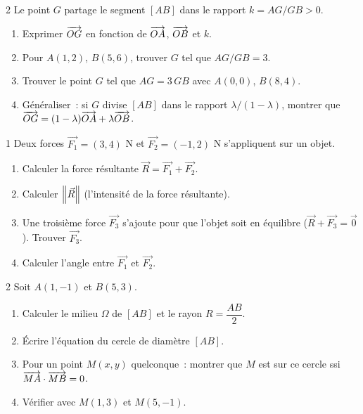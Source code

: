 \begin{probleme}{2}
Le point $G$ partage le segment $[AB]$ dans le rapport $k = AG/GB > 0$.
\begin{enumerate}
  \item Exprimer $\overrightarrow{OG}$ en fonction de $\overrightarrow{OA}$, $\overrightarrow{OB}$ et $k$.
  \item Pour $A(1,2)$, $B(5,6)$, trouver $G$ tel que $AG/GB = 3$.
  \item Trouver le point $G$ tel que $AG = 3\,GB$ avec $A(0,0)$, $B(8,4)$.
  \item G\'en\'eraliser~: si $G$ divise $[AB]$ dans le rapport $\lambda/(1-\lambda)$,
        montrer que $\overrightarrow{OG} = (1-\lambda)\overrightarrow{OA}+\lambda\overrightarrow{OB}$.
\end{enumerate}
\end{probleme}

\begin{probleme}{1}
Deux forces $\vec{F_1}=(3,4)$ N et $\vec{F_2}=(-1,2)$ N s'appliquent
sur un objet.
\begin{enumerate}
  \item Calculer la force r\'esultante $\vec{R}=\vec{F_1}+\vec{F_2}$.
  \item Calculer $\left\|\vec{R}\right\|$ (l'intensit\'e de la force r\'esultante).
  \item Une troisi\`eme force $\vec{F_3}$ s'ajoute pour que l'objet soit
        en \'equilibre ($\vec{R}+\vec{F_3}=\vec{0}$). Trouver $\vec{F_3}$.
  \item Calculer l'angle entre $\vec{F_1}$ et $\vec{F_2}$.
\end{enumerate}
\end{probleme}

\begin{probleme}{2}
Soit $A(1,-1)$ et $B(5,3)$.
\begin{enumerate}
  \item Calculer le milieu $\Omega$ de $[AB]$ et le rayon $R = \dfrac{AB}{2}$.
  \item \'Ecrire l'\'equation du cercle de diam\`etre $[AB]$.
  \item Pour un point $M(x,y)$ quelconque~:
        montrer que $M$ est sur ce cercle ssi $\overrightarrow{MA}\cdot\overrightarrow{MB}=0$.
  \item V\'erifier avec $M(1,3)$ et $M(5,-1)$.
\end{enumerate}
\end{probleme}


